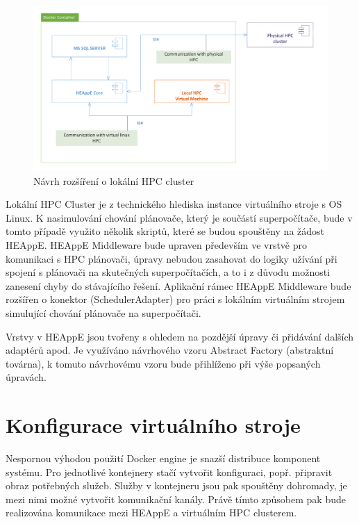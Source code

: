 \newpage
\begin{figure}
	\centering
	\includegraphics[width=1.0\textwidth]{Figures/main-docker-container-view.pdf}
	\caption{Návrh rozšíření o lokální HPC cluster}
	\label{fig:navrh-rozsireni-o-lokalni-hpc-clsuter}
\end{figure}

Lokální HPC Cluster je z technického hlediska instance virtuálního stroje s OS Linux. K nasimulování chování plánovače, který je součástí superpočítače, bude v tomto případě využito několik skriptů, které se budou spouštěny na žádost HEAppE. HEAppE Middleware bude upraven především ve vrstvě pro komunikaci s HPC plánovači, úpravy nebudou zasahovat do logiky užívání při spojení s plánovači na skutečných superpočítačích, a to i z důvodu možnosti zanesení chyby do stávajícího řešení. Aplikační rámec HEAppE Middleware bude rozšířen o konektor (SchedulerAdapter) pro práci s lokálním virtuálním strojem simulující chování plánovače na superpočítači.

Vrstvy v HEAppE jsou tvořeny s ohledem na pozdější úpravy či přidávání dalších adaptérů apod. Je využíváno návrhového vzoru Abstract Factory (abstraktní továrna), k tomuto návrhovému vzoru bude přihlíženo při výše popsaných úpravách.

\section{Konfigurace virtuálního stroje}
Nespornou výhodou použití Docker engine je snazší distribuce komponent systému. Pro jednotlivé kontejnery stačí vytvořit konfiguraci, popř. připravit obraz potřebných služeb. Služby v kontejneru jsou pak spouštěny dohromady, je mezi nimi možné vytvořit komunikační kanály. Právě tímto způsobem pak bude realizována komunikace mezi HEAppE a virtuálním HPC clusterem.

